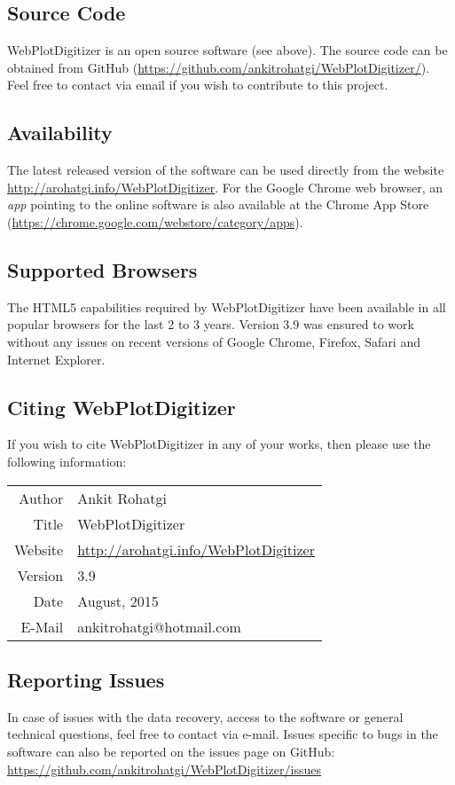 \documentclass[letterpaper, 10pt]{article}
\begin{document}
\subsection{Source Code}
WebPlotDigitizer is an open source software (see above). The source code can be obtained from GitHub (\url{https://github.com/ankitrohatgi/WebPlotDigitizer/}). Feel free to contact via email if you wish to contribute to this project.

\subsection{Availability}
The latest released version of the software can be used directly from the website \url{http://arohatgi.info/WebPlotDigitizer}. For the Google Chrome web browser, an \emph{app} pointing to the online software is also available at the Chrome App Store (\url{https://chrome.google.com/webstore/category/apps}).

\subsection{Supported Browsers}
The HTML5 capabilities required by WebPlotDigitizer have been available in all popular browsers for the last 2 to 3 years. Version 3.9 was ensured to work without any issues on recent versions of Google Chrome, Firefox, Safari and Internet Explorer.


\subsection{Citing WebPlotDigitizer}
If you wish to cite WebPlotDigitizer in any of your works, then please use the following information:

\begin{center}
\begin{tabular}{|r|l|}
\hline
Author & Ankit Rohatgi\\
Title & WebPlotDigitizer\\
Website & \url{http://arohatgi.info/WebPlotDigitizer}\\
Version & 3.9\\
Date & August, 2015\\
E-Mail & ankitrohatgi@hotmail.com\\
\hline
\end{tabular}
\end{center}

\subsection{Reporting Issues}
In case of issues with the data recovery, access to the software or general technical questions, feel free to contact via e-mail. Issues specific to bugs in the software can also be reported on the issues page on GitHub: \url{https://github.com/ankitrohatgi/WebPlotDigitizer/issues}
\end{document}
